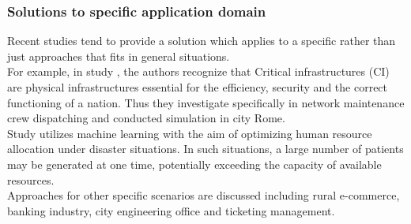 \documentclass[runningheads]{llncs}
\begin{document}
\subsubsection{Solutions to specific application domain} Recent studies tend to provide a solution which applies to a specific rather than just approaches that fits in general situations. \\
For example, in study \cite{study1}, the authors recognize that Critical infrastructures (CI) are physical infrastructures essential for the efficiency, security and the correct functioning of a nation. Thus they investigate specifically in network maintenance crew dispatching and conducted simulation in city Rome. \\
Study\cite{study9} utilizes machine learning with the aim of optimizing human resource allocation under disaster situations. In such situations, a large number of patients may be generated at one time, potentially exceeding the capacity of available resources.\\
Approaches for other specific scenarios are discussed including rural e-commerce\cite{study15}, banking industry\cite{study4}, city engineering office \cite{study6} and ticketing management\cite{study11}.
\end{document}
